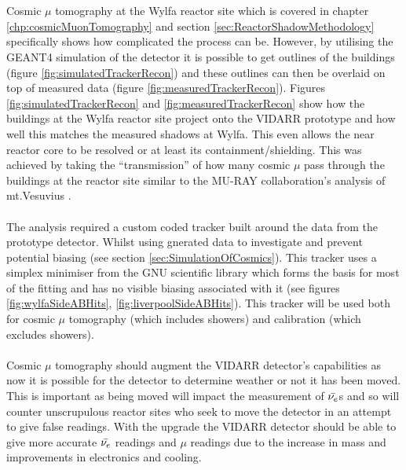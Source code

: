 \\\\Cosmic $\mu$ tomography at the Wylfa reactor site which is covered in chapter  \ref{chp:cosmicMuonTomography} and section \ref{sec:ReactorShadowMethodology} specifically shows how complicated the process can be. However, by utilising the GEANT4 simulation of the detector it is possible to get outlines of the buildings (figure \ref{fig:simulatedTrackerRecon}) and these outlines can then be overlaid on top of measured data (figure \ref{fig:measuredTrackerRecon}). Figures \ref{fig:simulatedTrackerRecon} and \ref{fig:measuredTrackerRecon} show how the buildings at the Wylfa reactor site project onto the VIDARR prototype and how well this matches the measured shadows at Wylfa. This even allows the near reactor core to be resolved or at least its containment/shielding. This was achieved by taking the ``transmission'' of how many cosmic $\mu$ pass through the buildings at the reactor site similar to the  MU-RAY collaboration's analysis of mt.Vesuvius \cite{Ambrosino_2014}.    
\\\\The analysis required a custom coded tracker built around the data from the prototype detector. Whilst using gnerated data to investigate and prevent potential biasing (see section \ref{sec:SimulationOfCosmics}). This tracker uses a simplex minimiser from the GNU scientific library \cite{galassi2002gnu} which forms the basis for most of the fitting and has no visible biasing associated with it (see figures \ref{fig:wylfaSideABHits}, \ref{fig:liverpoolSideABHits}). This tracker will be used both for cosmic $\mu$ tomography (which includes showers) and calibration (which excludes showers). 
\\\\Cosmic $\mu$ tomography should augment the VIDARR detector's capabilities as now it is possible for the detector to determine weather or not it has been moved. This is important as being moved will impact the measurement of $\Bar{\nu_e}$s and so will counter unscrupulous reactor sites who seek to move the detector in an attempt to give false readings. With the upgrade the VIDARR detector should be able to give more accurate $\Bar{\nu_e}$ readings and $\mu$ readings due to the increase in mass and improvements in electronics and cooling. 